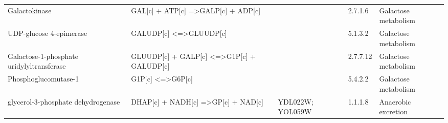 {\begin{landscape}
\begin{longtable}{p{.25\linewidth} | p{.40\linewidth} | p{.19\linewidth} | p{.05\linewidth} | p{.10\linewidth}}
Galactokinase                                                                             & GAL{[}c{]} + ATP{[}c{]} =\textgreater GALP{[}c{]} + ADP{[}c{]}                                                                                  &                                                                                                                                                                  & 2.7.1.6            & Galactose metabolism                                                        \\
UDP-glucose 4-epimerase                                                                   & GALUDP{[}c{]} \textless{}=\textgreater GLUUDP{[}c{]}                                                                                            &                                                                                                                                                                  & 5.1.3.2            & Galactose metabolism                                                        \\
Galactose-1-phosphate uridylyltransferase                                                 & GLUUDP{[}c{]} + GALP{[}c{]} \textless{}=\textgreater G1P{[}c{]} + GALUDP{[}c{]}                                                                 &                                                                                                                                                                  & 2.7.7.12           & Galactose metabolism                                                        \\
Phosphoglucomutase-1                                                                      & G1P{[}c{]} \textless{}=\textgreater G6P{[}c{]}                                                                                                  &                                                                                                                                                                  & 5.4.2.2            & Galactose metabolism                                                        \\
glycerol-3-phosphate dehydrogenase                                                        & DHAP{[}c{]} + NADH{[}c{]} =\textgreater GP{[}c{]} + NAD{[}c{]}                                                                                  & YDL022W; YOL059W                                                                                                                                                 & 1.1.1.8            & Anaerobic excretion                                                         \\

\end{longtable}
\end{landscape}}
